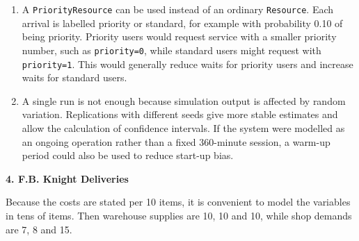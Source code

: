\documentclass[11pt,a4paper]{article}
\begin{document}
\begin{enumerate}
The Erlang C formula for the M/M/$c$ queue agrees: 92.0\% for 3 advisers and 99.1\% for 4.
The minimum staffing level that meets the target is therefore \textbf{4 advisers}.


\item A \texttt{PriorityResource} can be used instead of an ordinary \texttt{Resource}.
Each arrival is labelled priority or standard, for example with probability 0.10 of being priority.
Priority users would request service with a smaller priority number, such as \texttt{priority=0}, while standard users might request with \texttt{priority=1}.
This would generally reduce waits for priority users and increase waits for standard users.

\item A single run is not enough because simulation output is affected by random variation.
Replications with different seeds give more stable estimates and allow the calculation of confidence intervals.
If the system were modelled as an ongoing operation rather than a fixed 360-minute session, a warm-up period could also be used to reduce start-up bias.
\end{enumerate}

\newpage

\textbf{4. F.B. Knight Deliveries}

Because the costs are stated per 10 items, it is convenient to model the variables in tens of items.
Then warehouse supplies are 10, 10 and 10, while shop demands are 7, 8 and 15.
\end{document}
